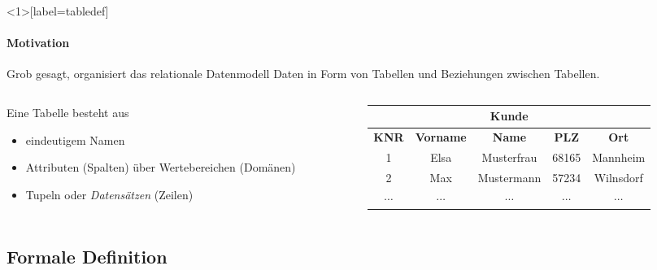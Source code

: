 \begin{frame}<1>[label=tabledef]{\insertsection}
	\framesubtitle{Motivation}
	Grob gesagt, organisiert das relationale Datenmodell Daten in Form von Tabellen und Beziehungen zwischen Tabellen.\abs
	\begin{columns}
		\begin{column}{.40\textwidth}
			Eine Tabelle besteht aus
			\begin{itemize}
				\item eindeutigem Namen
				\item Attributen (Spalten) über Wertebereichen (Domänen) 
				\item Tupeln oder \emph{Datens\"atzen} (Zeilen)
			\end{itemize}
		\end{column}
		\begin{column}{.56\textwidth}
			\begin{tabular}{|c|c|c|c|c|}\hline
				\multicolumn{5}{|c|}{\small \textbf{Kunde}}\\\hline\hline
				 \small \textbf{KNR} & \small \textbf{Vorname} & \small \textbf{Name} & \small \textbf{PLZ} & \small \textbf{Ort} \\\hline
				\small 1 &\small Elsa &\small Musterfrau &\small 68165 &\small Mannheim \\\hline
				\small 2 & \small Max &\small  Mustermann & \small 57234 &\small Wilnsdorf \\\hline
				$\cdots$ & $\cdots$ & $\cdots$ & $\cdots$ & $\cdots$ \\\hline
			\end{tabular}
		\end{column}
	\end{columns}
\end{frame}

\subsection{Formale Definition}

